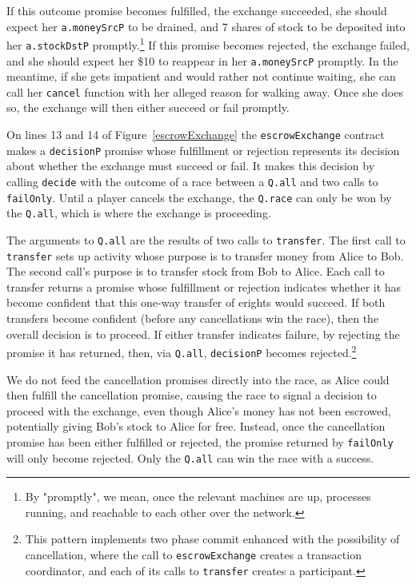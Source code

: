 \documentclass{llncs}
\begin{document}
If this outcome promise becomes fulfilled, the exchange succeeded,  she should expect her {\tt a.moneySrcP} to be drained, and 7 shares of stock to be deposited into her {\tt a.stockDstP} promptly.\footnote{
%
By "promptly", we mean, once the relevant machines are up, processes running, and reachable to each other over the network.
%
} If this promise becomes rejected, the exchange failed, and she should expect her \$10 to reappear in her {\tt a.moneySrcP} promptly. In the meantime, if she gets impatient and would rather not continue waiting, she can call her {\tt cancel} function with her alleged reason for walking away. Once she does so, the exchange will then either succeed or fail promptly.

On lines 13 and 14 of Figure~\ref{escrowExchange} the {\tt escrowExchange} contract makes a {\tt decisionP} promise whose fulfillment or rejection represents its decision about whether the exchange must succeed or fail. It makes this decision by calling {\tt decide} with the outcome of a race between a {\tt Q.all} and two calls to {\tt failOnly}. Until a player cancels the exchange, the {\tt Q.race} can only be won by the {\tt Q.all}, which is where the exchange is proceeding.

The arguments to {\tt Q.all} are the results of two calls to {\tt transfer}. The first call to {\tt transfer} sets up activity whose purpose is to transfer money from Alice to Bob. The second call's purpose is to transfer stock from Bob to Alice. Each call to transfer returns a promise whose fulfillment or rejection indicates whether it has become confident that this one-way transfer of erights would succeed. If both transfers become confident (before any cancellations win the race), then the overall decision is to proceed. If either transfer indicates failure, by rejecting the promise it has returned, then, via {\tt Q.all}, {\tt decisionP} becomes rejected.\footnote{
%
This pattern implements two phase commit enhanced with the possibility of cancellation, where the call to {\tt escrowExchange} creates a transaction coordinator, and each of its calls to {\tt transfer} creates a participant.}

We do not feed the cancellation promises directly into the race, as Alice could then fulfill the cancellation promise, causing the race to signal a decision to proceed with the exchange, even though Alice's money has not been escrowed, potentially giving Bob's stock to Alice for free. Instead, once the cancellation promise has been either fulfilled or rejected, the promise returned by {\tt failOnly} will only become rejected. Only the {\tt Q.all} can win the race with a success.
\end{document}

